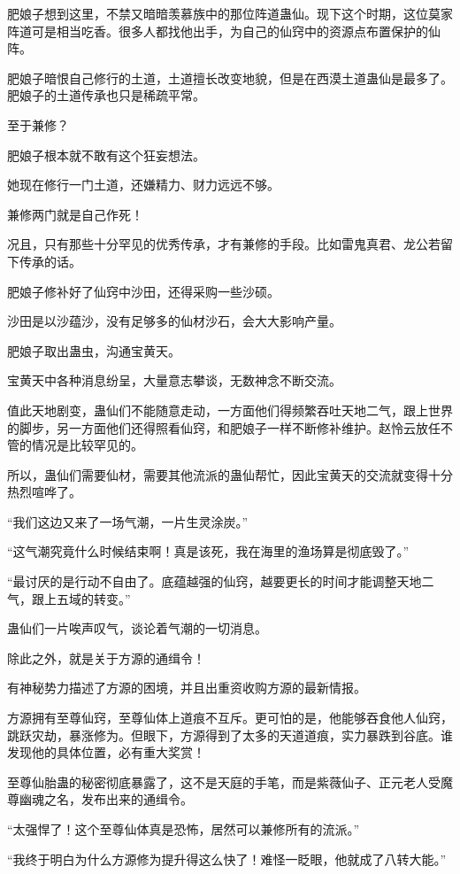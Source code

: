 \begin{this_body}
肥娘子想到这里，不禁又暗暗羡慕族中的那位阵道蛊仙。现下这个时期，这位莫家阵道可是相当吃香。很多人都找他出手，为自己的仙窍中的资源点布置保护的仙阵。

肥娘子暗恨自己修行的土道，土道擅长改变地貌，但是在西漠土道蛊仙是最多了。肥娘子的土道传承也只是稀疏平常。

至于兼修？

肥娘子根本就不敢有这个狂妄想法。

她现在修行一门土道，还嫌精力、财力远远不够。

兼修两门就是自己作死！

况且，只有那些十分罕见的优秀传承，才有兼修的手段。比如雷鬼真君、龙公若留下传承的话。

肥娘子修补好了仙窍中沙田，还得采购一些沙硕。

沙田是以沙蕴沙，没有足够多的仙材沙石，会大大影响产量。

肥娘子取出蛊虫，沟通宝黄天。

宝黄天中各种消息纷呈，大量意志攀谈，无数神念不断交流。

值此天地剧变，蛊仙们不能随意走动，一方面他们得频繁吞吐天地二气，跟上世界的脚步，另一方面他们还得照看仙窍，和肥娘子一样不断修补维护。赵怜云放任不管的情况是比较罕见的。

所以，蛊仙们需要仙材，需要其他流派的蛊仙帮忙，因此宝黄天的交流就变得十分热烈喧哗了。

“我们这边又来了一场气潮，一片生灵涂炭。”

“这气潮究竟什么时候结束啊！真是该死，我在海里的渔场算是彻底毁了。”

“最讨厌的是行动不自由了。底蕴越强的仙窍，越要更长的时间才能调整天地二气，跟上五域的转变。”

蛊仙们一片唉声叹气，谈论着气潮的一切消息。

除此之外，就是关于方源的通缉令！

有神秘势力描述了方源的困境，并且出重资收购方源的最新情报。

方源拥有至尊仙窍，至尊仙体上道痕不互斥。更可怕的是，他能够吞食他人仙窍，跳跃灾劫，暴涨修为。但眼下，方源得到了太多的天道道痕，实力暴跌到谷底。谁发现他的具体位置，必有重大奖赏！

至尊仙胎蛊的秘密彻底暴露了，这不是天庭的手笔，而是紫薇仙子、正元老人受魔尊幽魂之名，发布出来的通缉令。

“太强悍了！这个至尊仙体真是恐怖，居然可以兼修所有的流派。”

“我终于明白为什么方源修为提升得这么快了！难怪一眨眼，他就成了八转大能。”


\end{this_body}
